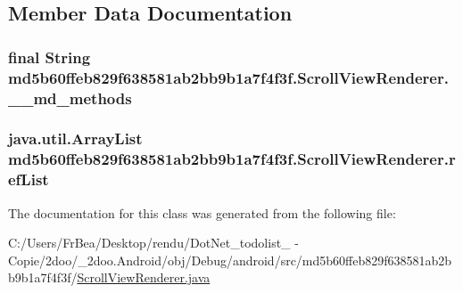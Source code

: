 \subsection{Member Data Documentation}
\hypertarget{classmd5b60ffeb829f638581ab2bb9b1a7f4f3f_1_1_scroll_view_renderer_b2b998afe39872cdd0f9f5caea97ed1c}{
\subsubsection[{\_\-\_\-md\_\-methods}]{\setlength{\rightskip}{0pt plus 5cm}final String {\bf md5b60ffeb829f638581ab2bb9b1a7f4f3f.ScrollViewRenderer.\_\-\_\-md\_\-methods}}}
\label{classmd5b60ffeb829f638581ab2bb9b1a7f4f3f_1_1_scroll_view_renderer_b2b998afe39872cdd0f9f5caea97ed1c}


\hypertarget{classmd5b60ffeb829f638581ab2bb9b1a7f4f3f_1_1_scroll_view_renderer_abea0e84f8655032f0b5e1be5a0da571}{
\subsubsection[{refList}]{\setlength{\rightskip}{0pt plus 5cm}java.util.ArrayList {\bf md5b60ffeb829f638581ab2bb9b1a7f4f3f.ScrollViewRenderer.refList}}}
\label{classmd5b60ffeb829f638581ab2bb9b1a7f4f3f_1_1_scroll_view_renderer_abea0e84f8655032f0b5e1be5a0da571}




The documentation for this class was generated from the following file:\begin{CompactItemize}
\item 
C:/Users/FrBea/Desktop/rendu/DotNet\_\-todolist\_ - Copie/2doo/\_\-2doo.Android/obj/Debug/android/src/md5b60ffeb829f638581ab2bb9b1a7f4f3f/\hyperlink{_scroll_view_renderer_8java}{ScrollViewRenderer.java}\end{CompactItemize}
